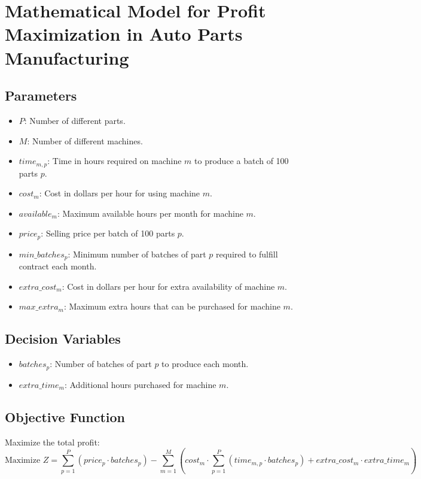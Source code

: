 \documentclass{article}
\begin{document}
\section*{Mathematical Model for Profit Maximization in Auto Parts Manufacturing}

\subsection*{Parameters}
\begin{itemize}
    \item $P$: Number of different parts.
    \item $M$: Number of different machines.
    \item $time_{m,p}$: Time in hours required on machine $m$ to produce a batch of 100 parts $p$.
    \item $cost_{m}$: Cost in dollars per hour for using machine $m$.
    \item $available_{m}$: Maximum available hours per month for machine $m$.
    \item $price_{p}$: Selling price per batch of 100 parts $p$.
    \item $min\_batches_{p}$: Minimum number of batches of part $p$ required to fulfill contract each month.
    \item $extra\_cost_{m}$: Cost in dollars per hour for extra availability of machine $m$.
    \item $max\_extra_{m}$: Maximum extra hours that can be purchased for machine $m$.
\end{itemize}

\subsection*{Decision Variables}
\begin{itemize}
    \item $batches_{p}$: Number of batches of part $p$ to produce each month.
    \item $extra\_time_{m}$: Additional hours purchased for machine $m$.
\end{itemize}

\subsection*{Objective Function}
Maximize the total profit:
\[
\text{Maximize } Z = \sum_{p=1}^{P} (price_{p} \cdot batches_{p}) - \sum_{m=1}^{M} \left( cost_{m} \cdot \sum_{p=1}^{P} (time_{m,p} \cdot batches_{p}) + extra\_cost_{m} \cdot extra\_time_{m} \right)
\]
\end{document}
